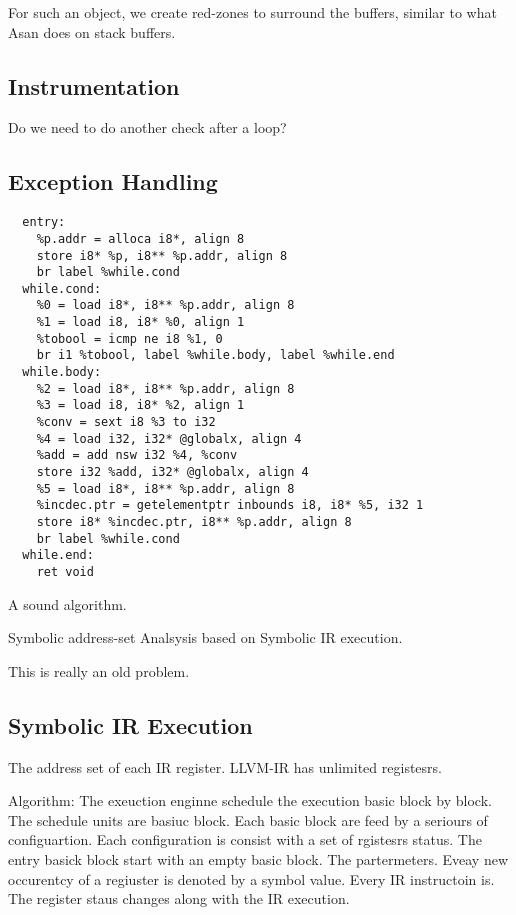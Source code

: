 For such an object, we create red-zones to surround the buffers, similar to what Asan does on stack buffers.

\subsection{Instrumentation}

Do we need to do another check after a loop?

\subsection{Exception Handling}


\begin{verbatim}
  entry:
    %p.addr = alloca i8*, align 8
    store i8* %p, i8** %p.addr, align 8
    br label %while.cond  
  while.cond:
    %0 = load i8*, i8** %p.addr, align 8
    %1 = load i8, i8* %0, align 1
    %tobool = icmp ne i8 %1, 0
    br i1 %tobool, label %while.body, label %while.end
  while.body:    
    %2 = load i8*, i8** %p.addr, align 8
    %3 = load i8, i8* %2, align 1
    %conv = sext i8 %3 to i32
    %4 = load i32, i32* @globalx, align 4
    %add = add nsw i32 %4, %conv
    store i32 %add, i32* @globalx, align 4
    %5 = load i8*, i8** %p.addr, align 8
    %incdec.ptr = getelementptr inbounds i8, i8* %5, i32 1
    store i8* %incdec.ptr, i8** %p.addr, align 8
    br label %while.cond  
  while.end:
    ret void
\end{verbatim}

A sound algorithm.

Symbolic address-set Analsysis based on Symbolic IR execution.

This is really an old problem.



\subsection{Symbolic IR Execution}


The address set of each IR register.
LLVM-IR has unlimited registesrs.

Algorithm:
The exeuction enginne schedule the execution basic block by block.
The schedule units are basiuc block.
Each basic block are feed by a seriours of configuartion.
Each configuration is consist with a set of rgistesrs status.
The entry basick block start with an empty basic block.
The partermeters.
Eveay new occurentcy of a regiuster is denoted by a symbol value.
Every IR instructoin is.
The register staus changes along with the IR execution.

